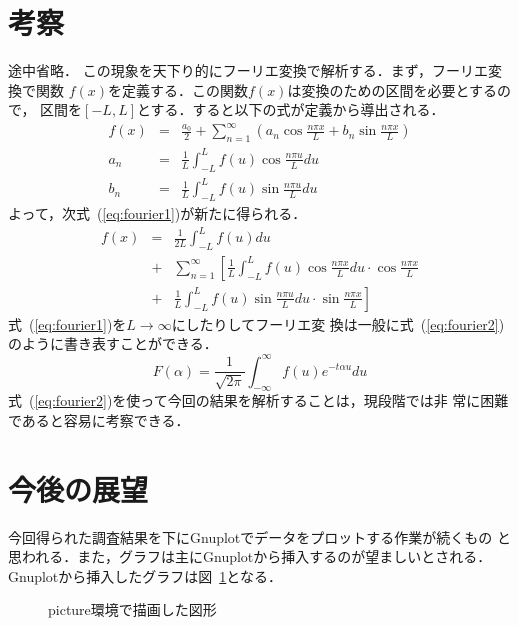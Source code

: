 \begin{InTeX}
\section{考察}
途中省略． 
この現象を天下り的にフーリエ変換で解析する．まず，フーリエ変換で関数
$f(x)$を定義する．この関数$f(x)$は変換のための区間を必要とするので，
区間を$[-L,L]$とする．すると以下の式が定義から導出される．
\begin{eqnarray*}
f(x)& = & \frac{a_0}{2} + \sum^{\infty}_{n=1} \left( a_n \cos 
          \frac{n\pi x}{L} + b_n \sin \frac{n\pi x}{L} \right) \\
a_n & = & \frac{1}{L} \int^{L}_{-L} f(u) \cos \frac{n\pi u}{L} du\\
b_n & = & \frac{1}{L} \int^{L}_{-L} f(u) \sin \frac{n\pi u}{L} du
\end{eqnarray*}
よって，次式~(\ref{eq:fourier1})が新たに得られる．
\begin{eqnarray}
f(x) & = & \frac{1}{2L} \int^{L}_{-L} f(u) du \nonumber\\
     & + & \sum^{\infty}_{n=1} \left[ \frac{1}{L} \int^{L}_{-L}
           f(u) \cos \frac{n\pi x}{L} du \cdot \cos \frac{n\pi x}{L}
           \right. \nonumber \\
     & + & \left. \frac{1}{L} \int^{L}_{-L} f(u) \sin 
           \frac{n\pi u }{L}du \cdot \sin \frac{n\pi x}{L} \right]
           \label{eq:fourier1}
\end{eqnarray}
式~(\ref{eq:fourier1})を\(L\rightarrow\infty\)にしたりしてフーリエ変
換は一般に式~(\ref{eq:fourier2})のように書き表すことができる．
\begin{equation}
F(\alpha )= \frac{1}{\sqrt{2\pi}} \int^{\infty}_{-\infty} 
            f(u) e^{-t\alpha u}du \label{eq:fourier2}
\end{equation}
式~(\ref{eq:fourier2})を使って今回の結果を解析することは，現段階では非
常に困難であると容易に考察できる．

\section{今後の展望}
今回得られた調査結果を下にGnuplotでデータをプロットする作業が続くもの
と思われる．また，グラフは主にGnuplotから挿入するのが望ましいとされる．
Gnuplotから挿入したグラフは図~\ref{fig:sample}となる．
\begin{figure}[htbp] 
 \centering
  \fbox{\rule{0pt}{3zw}\rule{3zw}{0pt}}
  \caption{picture環境で描画した図形}\label{fig:sample}
\end{figure}
\nocite{*}


\end{InTeX}

